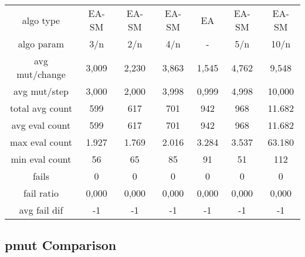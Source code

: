 \begin{tabular}[h]{ccccccc}
algo type&             EA-SM&      EA-SM&      EA-SM&         EA&      EA-SM&      EA-SM\\
algo param&              3/n&        2/n&        4/n&          -&        5/n&       10/n\\
avg mut/change&        3,009&      2,230&      3,863&      1,545&      4,762&      9,548\\
avg mut/step&          3,000&      2,000&      3,998&      0,999&      4,998&     10,000\\
\hline
total avg count&         599&        617&        701&        942&        968&     11.682\\
avg eval count&          599&        617&        701&        942&        968&     11.682\\
max eval count&        1.927&      1.769&      2.016&      3.284&      3.537&     63.180\\
min eval count&           56&         65&         85&         91&         51&        112\\
\hline
fails&                     0&          0&          0&          0&          0&          0\\
fail ratio&            0,000&      0,000&      0,000&      0,000&      0,000&      0,000\\
avg fail dif&             -1&         -1&         -1&         -1&         -1&         -1\\
\end{tabular}


\subsection{pmut Comparison}


